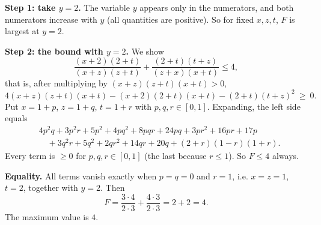 \textbf{Step 1: take $y=2$.} The variable $y$ appears only in the numerators, and both numerators increase with $y$ (all quantities are positive). So for fixed $x,z,t$, $F$ is largest at $y=2$.

\textbf{Step 2: the bound with $y=2$.} We show
\[
\dfrac{(x+2)(2+t)}{(x+z)(z+t)}+\dfrac{(2+t)(t+z)}{(z+x)(x+t)}\le4,
\]
that is, after multiplying by $(x+z)(z+t)(x+t)>0$,
\[
4(x+z)(z+t)(x+t)-(x+2)(2+t)(x+t)-(2+t)(t+z)^2\ \ge\ 0 .
\]
Put $x=1+p$, $z=1+q$, $t=1+r$ with $p,q,r\in[0,1]$. Expanding, the left side equals
\[
\begin{aligned}
&4p^2q+3p^2r+5p^2+4pq^2+8pqr+24pq+3pr^2+16pr+17p\\
&\quad+3q^2r+5q^2+2qr^2+14qr+20q+\left(2+r\right)\left(1-r\right)\left(1+r\right).
\end{aligned}
\]
Every term is $\ge0$ for $p,q,r\in[0,1]$ (the last because $r\le1$). So $F\le4$ always.

\textbf{Equality.} All terms vanish exactly when $p=q=0$ and $r=1$, i.e. $x=z=1$, $t=2$, together with $y=2$. Then
\[
F=\dfrac{3\cdot4}{2\cdot3}+\dfrac{4\cdot3}{2\cdot3}=2+2=4 .
\]
The maximum value is $\boxed{4}$.
